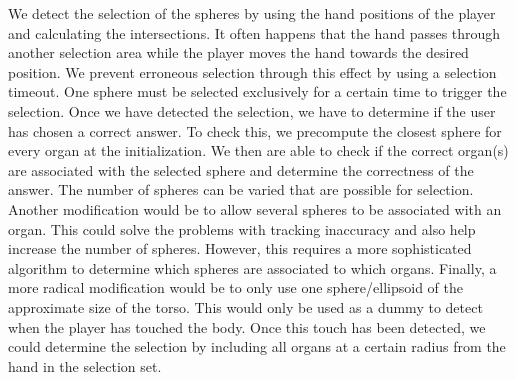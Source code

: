 We detect the selection of the spheres by using the hand positions of the player and calculating the intersections. It often happens that the hand passes through another selection area while the player moves the hand towards the desired position. We prevent erroneous selection through this effect by using a selection timeout. One sphere must be selected exclusively for a certain time to trigger the selection.
Once we have detected the selection, we have to determine if the user has chosen a correct answer. To check this, we precompute the closest sphere for every organ at the initialization. We then are able to check if the correct organ(s) are associated with the selected sphere and determine the correctness of the answer.
The number of spheres can be varied that are possible for selection. 
Another modification would be to allow several spheres to be associated with an organ. This could solve the problems with tracking inaccuracy and also help increase the number of spheres. However, this requires a more sophisticated algorithm to determine which spheres are associated to which organs.
Finally, a more radical modification would be to only use one sphere/ellipsoid of the approximate size of the torso. This would only be used as a dummy to detect when the player has touched the body. Once this touch has been detected, we could determine the selection by including all organs at a certain radius from the hand in the selection set. 

